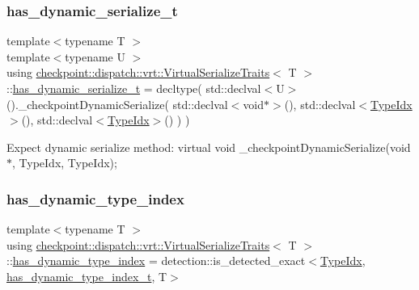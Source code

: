 \subsubsection{\texorpdfstring{has\+\_\+dynamic\+\_\+serialize\+\_\+t}{has\_dynamic\_serialize\_t}}
{\footnotesize\ttfamily template$<$typename T $>$ \\
template$<$typename U $>$ \\
using \hyperlink{structcheckpoint_1_1dispatch_1_1vrt_1_1_virtual_serialize_traits}{checkpoint\+::dispatch\+::vrt\+::\+Virtual\+Serialize\+Traits}$<$ T $>$\+::\hyperlink{structcheckpoint_1_1dispatch_1_1vrt_1_1_virtual_serialize_traits_a5b78afee2cf468bf3fedddb017c9aad0}{has\+\_\+dynamic\+\_\+serialize\+\_\+t} =  decltype( std\+::declval$<$U$>$().\+\_\+checkpoint\+Dynamic\+Serialize( std\+::declval$<$void$\ast$$>$(), std\+::declval$<$\hyperlink{namespacecheckpoint_1_1dispatch_1_1vrt_acd3f9e6b091bcfbc23dc35ea8ef45d3b}{Type\+Idx}$>$(), std\+::declval$<$\hyperlink{namespacecheckpoint_1_1dispatch_1_1vrt_acd3f9e6b091bcfbc23dc35ea8ef45d3b}{Type\+Idx}$>$() ) )}

Expect dynamic serialize method\+: virtual void \+\_\+checkpoint\+Dynamic\+Serialize(void$\ast$, Type\+Idx, Type\+Idx); \mbox{\label{structcheckpoint_1_1dispatch_1_1vrt_1_1_virtual_serialize_traits_a5eb693a371780ee8f5e81a825e62bd5d}} 
\subsubsection{\texorpdfstring{has\+\_\+dynamic\+\_\+type\+\_\+index}{has\_dynamic\_type\_index}}
{\footnotesize\ttfamily template$<$typename T $>$ \\
using \hyperlink{structcheckpoint_1_1dispatch_1_1vrt_1_1_virtual_serialize_traits}{checkpoint\+::dispatch\+::vrt\+::\+Virtual\+Serialize\+Traits}$<$ T $>$\+::\hyperlink{structcheckpoint_1_1dispatch_1_1vrt_1_1_virtual_serialize_traits_a5eb693a371780ee8f5e81a825e62bd5d}{has\+\_\+dynamic\+\_\+type\+\_\+index} =  detection\+::is\+\_\+detected\+\_\+exact$<$\hyperlink{namespacecheckpoint_1_1dispatch_1_1vrt_acd3f9e6b091bcfbc23dc35ea8ef45d3b}{Type\+Idx}, \hyperlink{structcheckpoint_1_1dispatch_1_1vrt_1_1_virtual_serialize_traits_a6a4e72c1d80374001f122c17ac1cc0e8}{has\+\_\+dynamic\+\_\+type\+\_\+index\+\_\+t}, T$>$}

